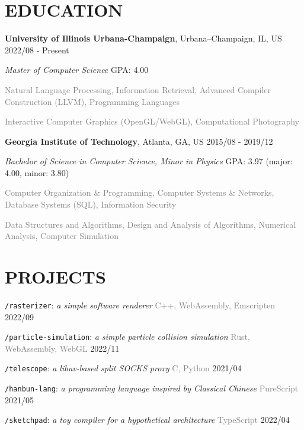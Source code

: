 \documentclass[10pt]{article}
\begin{document}
\section*{EDUCATION}
\textbf{University of Illinois Urbana-Champaign}, Urbana–Champaign, IL, US  \hfill 2022/08 - Present

\textit{Master of Computer Science}  \hfill GPA: 4.00

\vspace{0.5em}
\textcolor{gray}{Natural Language Processing, Information Retrieval, Advanced Compiler Construction (LLVM), Programming Languages}

\textcolor{gray}{Interactive Computer Graphics (OpenGL/WebGL), Computational Photography}

\vspace{1em}
\textbf{Georgia Institute of Technology}, Atlanta, GA, US \hfill 2015/08 - 2019/12

\textit{Bachelor of Science in Computer Science, Minor in Physics} \hfill GPA: 3.97 (major: 4.00, minor: 3.80)

\vspace{0.5em}
\textcolor{gray}{Computer Organization \& Programming, Computer Systems \& Networks, Database Systems (SQL), Information Security}

\textcolor{gray}{Data Structures and Algorithms, Design and Analysis of Algorithms, Numerical Analysis, Computer Simulation}


\section*{PROJECTS}

\vspace{0.5em}
\texttt{/rasterizer}: \textit{a simple software renderer} \hfill \textcolor{gray}{C++, WebAssembly, Emscripten} 2022/09

\vspace{0.5em}
\texttt{/particle-simulation}: \textit{a simple particle collision simulation} \hfill \textcolor{gray}{Rust, WebAssembly, WebGL}  2022/11

\vspace{0.5em}
\texttt{/telescope}: \textit{a libuv-based split SOCKS proxy} \hfill \textcolor{gray}{C, Python}  2021/04

\vspace{0.5em}
\texttt{/hanbun-lang}: \textit{a programming language inspired by Classical Chinese} \hfill \textcolor{gray}{PureScript}  2021/05

\vspace{0.5em}
\texttt{/sketchpad}: \textit{a toy compiler for a hypothetical architecture} \hfill \textcolor{gray}{TypeScript} 2022/04
\end{document}
